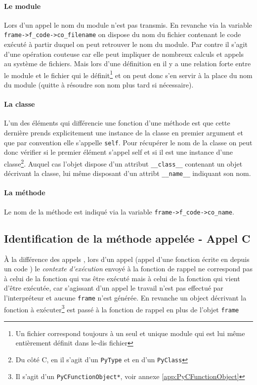 \paragraph*{Le module} Lors d'un appel \Python le nom du module n'est pas transmis. En revanche  via la variable \verb|frame->f_code->co_filename| on dispose du nom du fichier contenant le code exécuté à partir duquel on peut retrouver le nom du module. Par contre il s'agit d'une opération couteuse car elle peut impliquer de nombreux calculs et appels au système de fichiers. Mais lors d'une définition en \Python il y a une relation forte entre le module et le fichier qui le définit\footnote{Un fichier correspond toujours à un seul et unique module qui est lui même entièrement définit dans le-dis fichier} et on peut donc s'en servir à la place du nom du module (quitte à résoudre son nom plus tard si nécessaire).

\paragraph*{La classe} L'un des éléments qui différencie une fonction d'une méthode est que cette dernière prends explicitement une instance de la classe en premier argument et que par convention elle s'appelle \verb|self|. Pour récupérer le nom de la classe on peut donc vérifier si le premier élément s'appel self et si il est une instance d'une classe\footnote{Du côté C, en  il s'agit d'un \verb|PyType| et en  d'un \verb|PyClass|}. Auquel cas l'objet dispose d'un attribut \verb|__class__| contenant un objet décrivant la classe, lui même disposant d'un attribt \verb|__name__| indiquant son nom.

\paragraph*{La méthode} Le nom de la méthode est indiqué via la variable \verb|frame->f_code->co_name|.

\subsection{Identification de la méthode appelée - Appel C}
À la différence des appels \Python, lors d'un appel \C (appel d'une fonction écrite en \C depuis un code \Python) le \emph{\gls{contexte d'exécution}} envoyé à la fonction de rappel ne correspond pas à celui de la fonction qui vas être exécuté mais à celui de la fonction qui vient d'être exécutée, car s'agissant d'un appel \C le travail n'est pas effectué par l'interpréteur et aucune \verb|frame| n'est générée. En revanche un object décrivant la fonction \C à exécuter\footnote{Il s'agit d'un \verb|PyCFunctionObject*|, voir annexe \vref{app:PyCFunctionObject}} est passé à la fonction de rappel en plus de l'objet \verb|frame|

